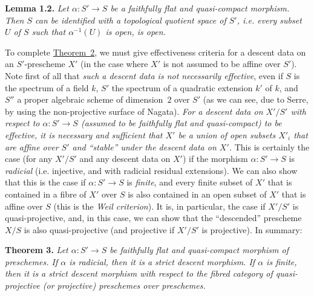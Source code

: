 \documentclass{article}
\newenvironment{itenv}[1]
  {\phantomsection\par\medskip\noindent\textbf{#1.}\itshape}
  {\par\medskip}
\newcommand{\oldpage}[1]{\marginpar{\footnotesize$\Big\vert$ \textit{p.~#1}}}
\begin{document}
\begin{itenv}{Lemma 1.2}
\label{lemma:B.1.2}
  Let $\alpha\colon S'\to S$ be a faithfully flat and quasi-compact morphism.
  Then $S$ can be identified with a \emph{topological quotient space of $S'$}, i.e. every subset $U$ of $S$ such that $\alpha^{-1}(U)$ is open, is open.
\end{itenv}

To complete \hyperref[theorem:B.1(2)]{Theorem~2}, we must give effectiveness criteria for a descent data on an $S'$-prescheme $X'$ (in the case where $X'$ is not assumed to be affine over $S'$).
Note first of all that \emph{such a descent data is not necessarily effective}, even if $S$ is the spectrum of a field $k$, $S'$ the spectrum of a quadratic extension $k'$ of $k$, and $S''$ a proper algebraic scheme of dimension~$2$ over $S'$ (as we can see, due to Serre, by using the non-projective surface of Nagata).
\emph{For a descent data on $X'/S'$ with respect to $\alpha\colon S'\to S$ (assumed to be faithfully flat and quasi-compact) to be effective, it is necessary and sufficient that $X'$ be a union of open subsets $X'_i$ that are affine over $S'$ and ``stable'' under the descent data on $X'$.}
This is certainly the case (for any $X'/S'$ and any descent data on $X'$) if the morphism $\alpha\colon S'\to S$ is \emph{radicial} (i.e. injective, and with
\oldpage{190-20}
radicial residual extensions).
We can also show that this is the case if $\alpha\colon S'\to S$ is \emph{finite}, and every finite subset of $X'$ that is contained in a fibre of $X'$ over $S$ is also contained in an open subset of $X'$ that is affine over $S$ (this is the \emph{Weil criterion}).
It is, in particular, the case if $X'/S'$ is quasi-projective, and, in this case, we can show that the ``descended'' prescheme $X/S$ is also quasi-projective (and projective if $X'/S'$ is projective).
In summary:

\begin{itenv}{Theorem 3}
\label{theorem:B.1(3)}
  Let $\alpha\colon S'\to S$ be faithfully flat and quasi-compact morphism of preschemes.
  If $\alpha$ is \emph{radicial}, then it is a \emph{strict descent morphism}.
  If $\alpha$ is finite, then it is a strict descent morphism with respect to the fibred category of quasi-projective (or projective) preschemes over preschemes.
\end{itenv}
\end{document}
